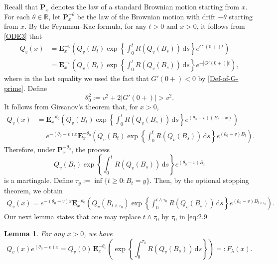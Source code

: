 \documentclass[10pt,a4paper]{amsart}
\newtheorem{lemma}[thrm]{Lemma}
\numberwithin{equation}{section}
\begin{document}
Recall that $\mathbf P_x$ denotes the law of a standard Brownian motion starting from $x$. 
For each $\theta\in \mathbb{R}$, let $\mathbf P_x^{-\theta}$ be the law of the Brownian motion with drift $-\theta$ starting from $x$. 
By the Feynman--Kac formula, for any $t > 0$ and $x > 0$, it follows from \eqref{ODE3} that
\begin{align}
	Q_v(x) 
	&= \mathbf E^{-v}_x \left( Q_v(B_t) \exp\left\{ \int_0^t R(Q_v(B_s)) \, \mathrm{d}s \right\} e^{G'(0+) t} \right) \nonumber\\
	&= \mathbf E^{-v}_x \left( Q_v(B_t) \exp\left\{ \int_0^t R(Q_v(B_s)) \, \mathrm{d}s \right\} e^{-|G'(0+)| t} \right),
\end{align}
where in the last equality we used the fact that $G'(0+) < 0$ by \eqref{Def-of-G-prime}.
Define
\begin{equation}\label{theta_0}
	\theta_0^2 := v^2 + 2 |G'(0+)| > v^2.
\end{equation}
It follows from Girsanov's theorem that, for $x > 0$,
\begin{align*}
	Q_v(x) 
	&= \mathbf E^{-\theta_0}_x
	\left( Q_v(B_t) \exp\left\{ \int_0^t R(Q_v(B_s)) \, \mathrm{d}s \right\} e^{(\theta_0 - v)(B_t - x)} \right) \nonumber\\
	&= e^{-(\theta_0 - v)x} \mathbf E^{-\theta_0}_x
	\left( Q_v(B_t) \exp\left\{ \int_0^t R(Q_v(B_s)) \, \mathrm{d}s \right\} e^{(\theta_0 - v) B_t} \right).
\end{align*}
Therefore, under $\mathbf{P}_x^{-\theta_0}$, the process
\[
Q_v(B_t) \exp\left\{ \int_0^t R(Q_v(B_s)) \, \mathrm{d}s \right\} e^{(\theta_0 - v) B_t}
\]
is a martingale. Define $\tau_y := \inf\{ t \ge 0 : B_t = y \}$. Then, by the optional stopping theorem, we obtain
\begin{align}\label{eq:2.9}
	Q_v(x) = e^{-(\theta_0 - v)x} \mathbf E^{-\theta_0}_x
	\left( Q_v(B_{t \wedge \tau_0}) \exp\left\{ \int_0^{t \wedge \tau_0} R(Q_v(B_s)) \, \mathrm{d}s \right\} e^{(\theta_0 - v) B_{t \wedge \tau_0}} \right).
\end{align}
Our next lemma states that one may replace $t \wedge \tau_0$ by $\tau_0$ in \eqref{eq:2.9}.

\begin{lemma}\label{le:2.1}
For any $x > 0$, we have
\[
Q_v(x) e^{(\theta_0 - v)x}
= Q_v(0) \, \mathbf E^{-\theta_0}_x
\left( \exp\left\{ \int_0^{\tau_0} R(Q_v(B_s)) \, \mathrm{d}s \right\} \right)
=: F_\lambda(x).
\]
\end{lemma}
\end{document}
